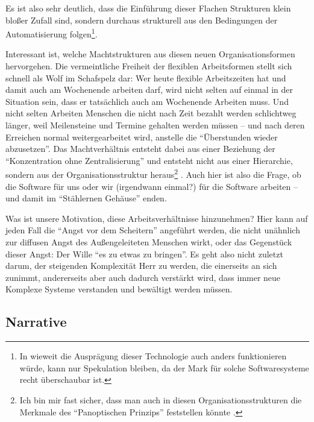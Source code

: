 Es ist also sehr deutlich, dass die Einführung dieser Flachen Strukturen klein bloßer Zufall sind, sondern durchaus strukturell aus den Bedingungen der Automatisierung folgen\footnote{In wieweit die Ausprägung dieser Technologie auch anders funktionieren würde, kann nur Spekulation bleiben, da der Mark für solche Softwaresysteme recht überschaubar ist\parencite[173]{arbeitsfrei}.}.

Interessant ist, welche Machtstrukturen aus diesen neuen Organisationsformen hervorgehen.
Die vermeintliche Freiheit der flexiblen Arbeitsformen stellt sich schnell als Wolf im Schafspelz dar: Wer heute flexible Arbeitszeiten hat und damit auch am Wochenende arbeiten darf, wird nicht selten auf einmal in der Situation sein, dass er tatsächlich auch am Wochenende Arbeiten muss. Und nicht selten Arbeiten Menschen die nicht nach Zeit bezahlt werden schlichtweg länger, weil Meilensteine und Termine gehalten werden müssen – und nach deren Erreichen normal weitergearbeitet wird, anstelle die \enquote{Überstunden wieder abzusetzen}.
Das Machtverhältnis entsteht dabei aus einer Beziehung der \enquote{Konzentration ohne Zentralisierung} und entsteht nicht aus einer Hierarchie, sondern aus der Organisationsstruktur heraus\footnote{Ich bin mir fast sicher, dass man auch in diesen Organisationsstrukturen die Merkmale des \enquote{Panoptischen Prinzips} feststellen könnte \parencite{foucault}.} \parencite[70]{sennett}.
Auch hier ist also die Frage, ob die Software für uns oder wir (irgendwann einmal?) für die Software arbeiten – und damit im \enquote{Stählernen Gehäuse} enden.

Was ist unsere Motivation, diese Arbeitsverhältnisse hinzunehmen?
Hier kann auf jeden Fall die \enquote{Angst vor dem Scheitern} angeführt werden\parencite[159ff.]{sennett}, die nicht unähnlich zur diffusen Angst des Außengeleiteten Menschen wirkt, oder das Gegenstück dieser Angst: Der Wille \enquote{es zu etwas zu bringen}.
Es geht also nicht zuletzt darum, der steigenden Komplexität Herr zu werden, die einerseits an sich zunimmt, andererseits aber auch dadurch verstärkt wird, dass immer neue Komplexe Systeme verstanden und bewältigt werden müssen.


\subsection{Narrative}

